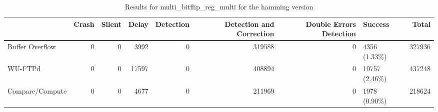 \begin{table}[t]
	\centering
	\caption{Results for multi_bitflip_reg_multi for the hamming version}
	\label{table:end_sim_by_status_hamming_2_multi_bitflip_reg_multi}
	\begin{tabular}{lrrrrrrlr}
		\toprule
		                & Crash & Silent & Delay & Detection & Detection and Correction & Double Errors Detection & Success        & Total  \\
		\midrule
		Buffer Overflow & 0     & 0      & 3992  & 0         & 319588                   & 0                       & 4356 (1.33\%)  & 327936 \\
		WU-FTPd         & 0     & 0      & 17597 & 0         & 408894                   & 0                       & 10757 (2.46\%) & 437248 \\
		Compare/Compute & 0     & 0      & 4677  & 0         & 211969                   & 0                       & 1978 (0.90\%)  & 218624 \\
		\bottomrule
	\end{tabular}
\end{table}
